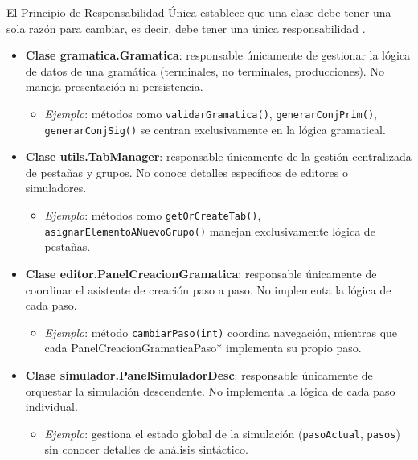 El Principio de Responsabilidad Única establece que una clase debe tener una sola razón para cambiar, es decir, debe tener una única responsabilidad \cite{martin2003agile, martin2018clean}.

\begin{itemize}
    \item \textbf{Clase gramatica.Gramatica}: responsable únicamente de gestionar la lógica de datos de una gramática (terminales, no terminales, producciones). No maneja presentación ni persistencia.
    \begin{itemize}
        \item \textit{Ejemplo}: métodos como \texttt{validarGramatica()}, \texttt{generarConjPrim()}, \texttt{generarConjSig()} se centran exclusivamente en la lógica gramatical.
    \end{itemize}

    \item \textbf{Clase utils.TabManager}: responsable únicamente de la gestión centralizada de pestañas y grupos. No conoce detalles específicos de editores o simuladores.
    \begin{itemize}
        \item \textit{Ejemplo}: métodos como \texttt{getOrCreateTab()}, \texttt{asignarElementoANuevoGrupo()} manejan exclusivamente lógica de pestañas.
    \end{itemize}

    \item \textbf{Clase editor.PanelCreacionGramatica}: responsable únicamente de coordinar el asistente de creación paso a paso. No implementa la lógica de cada paso.
    \begin{itemize}
        \item \textit{Ejemplo}: método \texttt{cambiarPaso(int)} coordina navegación, mientras que cada PanelCreacionGramaticaPaso* implementa su propio paso.
    \end{itemize}

    \item \textbf{Clase simulador.PanelSimuladorDesc}: responsable únicamente de orquestar la simulación descendente. No implementa la lógica de cada paso individual.
    \begin{itemize}
        \item \textit{Ejemplo}: gestiona el estado global de la simulación (\texttt{pasoActual}, \texttt{pasos}) sin conocer detalles de análisis sintáctico.
    \end{itemize}
\end{itemize}

